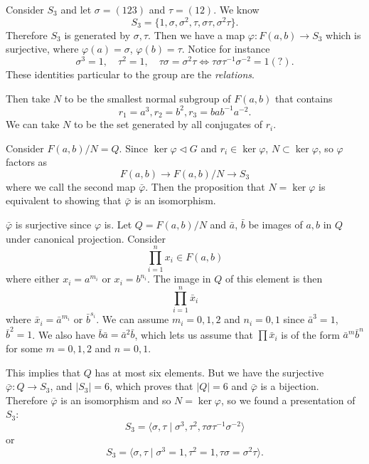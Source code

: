 \begin{xmpl}
Consider $S_3$ and let $\sigma = (123)$ and $\tau = (12)$. We know
$$
S_3 = \{ 1, \sigma, \sigma^2, \tau, \sigma \tau, \sigma^2 \tau \}.
$$
Therefore $S_3$ is generated by $\sigma, \tau$. Then we have a map
$\varphi : F(a, b) \to S_3$ which is surjective, where
$\varphi(a) = \sigma$, $\varphi(b) = \tau$. Notice for instance
$$
\sigma^3 = 1, \quad
\tau^2 = 1, \quad
\tau \sigma = \sigma^2 \tau  \iff \tau \sigma \tau^{-1} \sigma^{-2} =
1 (?).
$$
These identities particular to the group are the \emph{relations}.

Then take $N$ to be the smallest normal subgroup of $F(a,b)$ that
contains
$$
r_1 = a^3, r_2 = b^2, r_3 = b a b^{-1} a^{-2}.
$$
We can take $N$ to be the set generated by all conjugates of $r_i$.

Consider $F(a,b) / N = Q$. Since $\ker \varphi \triangleleft G$ and
$r_i \in \ker \varphi$, $N \subset \ker \varphi$, so $\varphi$ factors
as
$$
F(a, b) \to F(a, b) / N \to S_3
$$
where we call the second map $\bar{\varphi}$. Then the proposition
that $N = \ker \varphi$ is equivalent to showing that $\bar{\varphi}$
is an isomorphism.

$\bar{\varphi}$ is surjective since $\varphi$ is. Let
$Q = F(a,b) / N$ and $\bar{a}$, $\bar{b}$ be images of $a, b$ in $Q$
under canonical projection. Consider
$$
\prod_{i=1}^n x_i \in F(a,b)
$$
where either $x_i = a^{m_i}$ or $x_i = b^{n_i}$. The image in $Q$ of
this element is then
$$
\prod_{i=1}^n \bar{x}_i
$$
where $\bar{x}_i = \bar{a}^{m_i}$ or $\bar{b}^{s_i}$. We can assume
$m_i = 0, 1, 2$ and $n_i = 0, 1$ since $\bar{a}^3 = 1$, $\bar{b}^2 =
1$. We also have $\bar{b} \bar{a} = \bar{a}^2 \bar{b}$, which lets us
assume that $\prod \bar{x}_i$ is of the form $\bar{a}^m \bar{b}^n$ for
some $m = 0, 1, 2$ and $n = 0, 1$.

This implies that $Q$ has at most six elements. But we have the
surjective $\bar{\varphi} : Q \to S_3$, and $|S_3| =
6$, which proves that $|Q| = 6$ and $\bar{\varphi}$ is a
bijection. Therefore $\bar{\varphi}$ is an isomorphism and so
$N = \ker \varphi$, so we found a presentation of $S_3$:
$$
S_3 = \langle \sigma, \tau
        \mid \sigma^3, \tau^2, \tau \sigma \tau^{-1} \sigma^{-2}
      \rangle
$$
or
$$
S_3 = \langle \sigma, \tau
        \mid \sigma^3 = 1,
             \tau^2 = 1,
             \tau \sigma = \sigma^2 \tau
      \rangle.
$$
\end{xmpl}

